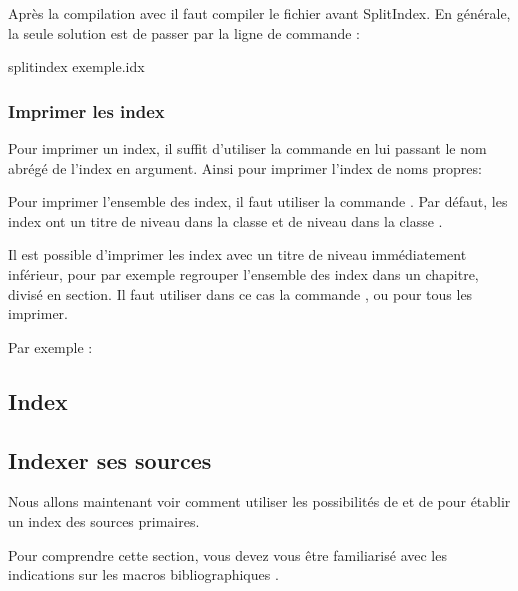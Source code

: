 \begin{bashcode}
\begin{latexcode}
\end{latexcode}

Après la compilation avec \XeLaTeX il faut compiler le fichier  avant SplitIndex. En générale, la seule solution est de passer par la ligne de commande :

\begin{bashcode}
splitindex exemple.idx
\end{bashcode}

\subsection{Imprimer les index}

Pour imprimer un index, il suffit d'utiliser la commande  en lui passant le nom abrégé de l'index en argument. Ainsi pour imprimer l'index de noms propres:

\begin{latexcode}
\printindex[npr]
\end{latexcode}

Pour imprimer l'ensemble des index, il faut utiliser la commande .
Par défaut, les index ont un titre de niveau  dans la classe  et de niveau  dans la classe .

 Il est possible d'imprimer les index avec un titre de niveau immédiatement inférieur, pour par exemple regrouper l'ensemble des index dans un chapitre, divisé en section. Il faut utiliser dans ce cas la commande , ou  pour tous les imprimer.

Par exemple :

\begin{latexcode}
\chapter{Index}
\printsubindex*
\end{latexcode}

\section{Indexer ses sources}


Nous allons maintenant voir comment utiliser les possibilités de  et de  pour établir un index des sources primaires.

Pour comprendre cette section, vous devez vous être familiarisé avec les indications sur les macros bibliographiques .




\end{bashcode}
